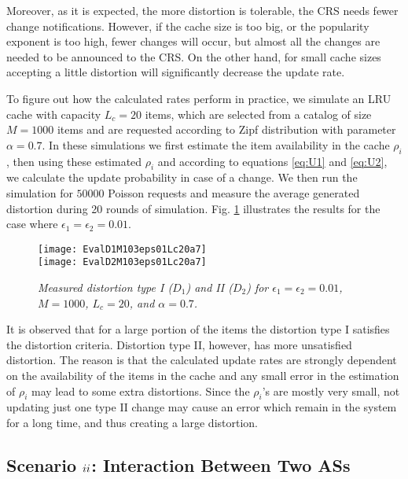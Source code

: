 \documentclass[conference]{IEEEtran}
\theoremstyle{plain}
\theoremstyle{remark}
\begin{document}
Moreover, as it is expected, the more distortion is tolerable, the CRS needs fewer change notifications. However, if the cache size is too big, or the popularity exponent is too high, fewer changes will occur, but almost all the changes are needed to be announced to the CRS. On the other hand, for small cache sizes accepting a little distortion will significantly decrease the update rate.

To figure out how the calculated rates perform in practice, we simulate an LRU cache with capacity $L_c=20$ items, which are selected from a catalog of size $M=1000$ items and are requested according to Zipf distribution with parameter $\alpha=0.7$. In these simulations we first estimate the item availability in the cache $\rho_i$, then using these estimated $\rho_i$ and according to equations \ref{eq:U1} and \ref{eq:U2}, we calculate the update probability in case of a change. We then run the simulation for $50000$ Poisson requests and measure the average generated distortion during 20 rounds of simulation. Fig. \ref{fig:EvalDist1} illustrates the results for the case where $\epsilon_1=\epsilon_2=0.01$.

\begin{figure}[http]
    \center
      \texttt{[image: EvalD1M103eps01Lc20a7]}\\
			\texttt{[image: EvalD2M103eps01Lc20a7]}\\
      \caption{\textit{Measured distortion type I ($D_1$) and II ($D_2$) for $\epsilon_1=\epsilon_2=0.01$, $M=1000$, $L_c=20$, and $\alpha=0.7$.}}
    \label{fig:EvalDist1}
\end{figure}

It is observed that for a large portion of the items the distortion type I satisfies the distortion criteria. Distortion type II, however, has more unsatisfied distortion. The reason is that the calculated update rates are strongly dependent on the availability of the items in the cache and any small error in the estimation of $\rho_i$ may lead to some extra distortions. Since the $\rho_i$'s are mostly very small, not updating just one type II change may cause an error which remain in the system for a long time, and thus creating a large distortion.



\subsection{Scenario $\romannumeral 2$: Interaction Between Two ASs}
\label{subsec:scenario2}
\end{document}
